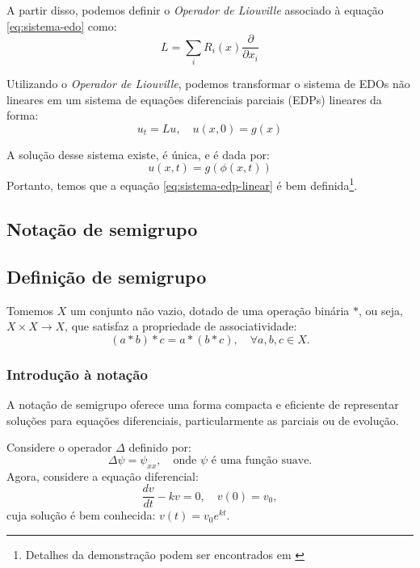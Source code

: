 A partir disso, podemos definir o \textit{Operador de Liouville} associado à equação \eqref{eq:sistema-edo} como:
\begin{equation}
	L = \sum_i R_i(x) \frac{\partial}{\partial x_i}
	\label{eq:liouville-operator}
\end{equation}

Utilizando o \textit{Operador de Liouville}, podemos transformar o sistema de EDOs não lineares em um sistema de equações diferenciais parciais (EDPs) lineares da forma:
\begin{equation}
	u_t = Lu, \quad u(x,0) = g(x)
	\label{eq:sistema-edp-linear}
\end{equation}

A solução desse sistema existe, é única, e é dada por:
\begin{equation}
	u(x,t) = g(\phi(x,t))   
	\label{eq:solucao-sistema-edp-linear}
\end{equation}
Portanto, temos que a equação \eqref{eq:sistema-edp-linear} é bem definida\footnote{Detalhes da demonstração podem ser encontrados em \citet[p.~181-182]{Chorin2013}}.

\subsection{Notação de semigrupo}
\subsection{Definição de semigrupo}
Tomemos $X$ um conjunto não vazio, dotado de uma operação binária $ * $, ou seja, $ X \times X \to X $, que satisfaz a propriedade de associatividade:
\begin{equation*}
	(a * b) * c = a * (b * c), \quad \forall a,b,c \in X.
\end{equation*}

\subsubsection{Introdução à notação}
A notação de semigrupo oferece uma forma compacta e eficiente de representar soluções para equações diferenciais, particularmente as parciais ou de evolução.

Considere o operador $\Delta$ definido por:
\begin{equation*}
	\Delta \psi = \psi_{xx}, \quad \text{onde $\psi$ é uma função suave}.
\end{equation*}
Agora, considere a equação diferencial:
\begin{equation*}
	\frac{dv}{dt} - kv = 0, \quad v(0) = v_0,
\end{equation*}
cuja solução é bem conhecida: $ v(t) = v_0 e^{kt} $.

